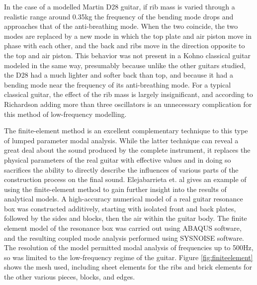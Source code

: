 \documentclass[
reprint,amsmath,amssymb,showpacs,citeautoscript,prb,twocolumn,notitlepage,floatfix
]{revtex4-1}
\begin{document}
In the case of a modelled Martin D28 guitar, if rib mass is varied through a realistic range around 0.35kg the frequency of the bending mode drops and approaches that of the anti-breathing mode. When the two coincide, the two modes are replaced by a new mode in which the top plate and air piston move in phase with each other, and the back and ribs move in the direction opposite to the top and air piston. This behavior was not present in a Kohno classical guitar modeled in the same way, presumably because unlike the other guitars studied, the D28 had a much lighter and softer back than top, and because it had a bending mode near the frequency of its anti-breathing mode. For a typical classical guitar, the effect of the rib mass is largely insignificant, and according to Richardson adding more than three oscillators is an unnecessary complication for this method of low-frequency modelling.\cite{richardson:hal-00811279}

The finite-element method is an excellent complementary technique to this type of lumped parameter modal analysis. While the latter technique can reveal a great deal about the sound produced by the complete instrument, it replaces the physical parameters of the real guitar with effective values and in doing so sacrifices the ability to directly describe the influences of various parts of the construction process on the final sound. Elejabarrieta et. al gives an example of using the finite-element method to gain further insight into the results of analytical models.\cite{elejabarrieta2002:doi:10.1121/1.1470163} A high-accuracy numerical model of a real guitar resonance box was constructed additively, starting with isolated front and back plates, followed by the sides and blocks, then the air within the guitar body.  The finite element model of the resonance box was carried out using ABAQUS software, and the resulting coupled mode analysis performed using SYSNOISE software. The resolution of the model permitted modal analysis of frequencies up to 500Hz, so was limited to the low-frequency regime of the guitar. Figure \ref{fig:finiteelement} shows the mesh used, including sheet elements for the ribs and brick elements for the other various pieces, blocks, and edges.
\end{document}
